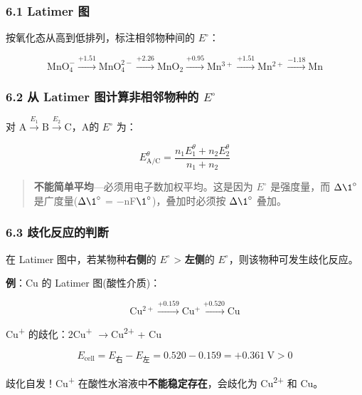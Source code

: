 \documentclass[a4paper,11pt]{ctexart}
\newcommand{\箭}{\ensuremath{\rightarrow}}
\newcommand{\左箭}{\ensuremath{\leftarrow}}
\newcommand{\上箭}{\ensuremath{\uparrow}}
\newcommand{\下箭}{\ensuremath{\downarrow}}
\newcommand{\衡}{\ensuremath{\rightleftharpoons}}
\newcommand{\双箭}{\ensuremath{\leftrightarrow}}
\newcommand{\约等于}{\ensuremath{\approx}}
\newcommand{\小于等于}{\ensuremath{\leq}}
\newcommand{\大于等于}{\ensuremath{\geq}}
\newcommand{\不等于}{\ensuremath{\neq}}
\newcommand{\西格马}{\ensuremath{\sigma}}
\newcommand{\派}{\ensuremath{\pi}}
\begin{document}
\subsubsection{6.1 Latimer 图}\label{latimer-ux56fe}

按氧化态从高到低排列，标注相邻物种间的 \(E^{\circ}\)：

\[
\mathrm{MnO_4^-} \xrightarrow{+1.51} \mathrm{MnO_4^{2-}} \xrightarrow{+2.26} \mathrm{MnO_2} \xrightarrow{+0.95} \mathrm{Mn^{3+}} \xrightarrow{+1.51} \mathrm{Mn^{2+}} \xrightarrow{-1.18} \mathrm{Mn}
\]

\subsubsection{\texorpdfstring{6.2 从 Latimer 图计算非相邻物种的 \(E^{\circ}\)}{6.2 从 Latimer 图计算非相邻物种的 E\^{}\{\textbackslash circ\}}}\label{ux4ece-latimer-ux56feux8ba1ux7b97ux975eux76f8ux90bbux7269ux79cdux7684-ecirc}

对 \(\mathrm{A} \xrightarrow{E_1} \mathrm{B} \xrightarrow{E_2} \mathrm{C}\)，A 的 \(E^{\circ}\) 为：

\[
E^\theta_{\mathrm{A/C}} = \frac{n_1 E_1^\theta + n_2 E_2^\theta}{n_1 + n_2}
\]

\begin{quote}
\textbf{不能简单平均}---必须用电子数加权平均。这是因为 \(E^{\circ}\) 是强度量，而 \(\Delta \1^{\circ}\) 是广度量(\(\Delta \1^{\circ}\) = −nF\(\1^{\circ}\))，叠加时必须按 \(\Delta \1^{\circ}\) 叠加。
\end{quote}

\subsubsection{6.3 歧化反应的判断}\label{ux6b67ux5316ux53cdux5e94ux7684ux5224ux65ad}

在 Latimer 图中，若某物种\textbf{右侧}的 \(E^{\circ}\) \textgreater{} \textbf{左侧}的 \(E^{\circ}\)，则该物种可发生歧化反应。

\textbf{例}：Cu 的 Latimer 图(酸性介质)：

\[\mathrm{Cu^{2+}} \xrightarrow{+0.159} \mathrm{Cu^+} \xrightarrow{+0.520} \mathrm{Cu}\]

Cu\textsuperscript{+} 的歧化：2Cu\textsuperscript{+} \箭 Cu\textsuperscript{2+} + Cu

\[E_{\text{cell}} = E_{\text{右}} - E_{\text{左}} = 0.520 - 0.159 = +0.361\ \mathrm{V} > 0\]

歧化自发！Cu\textsuperscript{+} 在酸性水溶液中\textbf{不能稳定存在}，会歧化为 Cu\textsuperscript{2+} 和 Cu。
\end{document}
